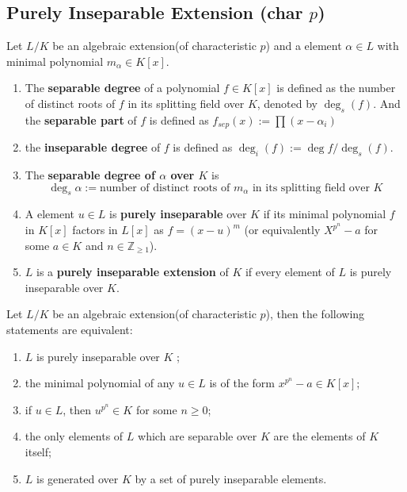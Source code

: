 \subsection{Purely Inseparable Extension (char $p$)} %
\begin{definition}
    Let $L/K$ be an algebraic extension(of characteristic $p$) and a element $\alpha \in L$ with minimal polynomial $m_\alpha \in K[x]$.
    \begin{enumerate}
        \item
              The \textbf{separable degree} of a polynomial $f \in K[x]$ is defined as the number of distinct roots of $f$ in its splitting field over $K$, denoted by $\deg_s \left(f\right)$.
              And the \textbf{separable part} of $f$ is defined as  $f_{sep}(x):=\prod (x-\alpha_i)$
        \item
              the \textbf{inseparable degree} of $f$ is defined as $\deg_i (f):=\deg f/\deg_s (f)$.

        \item
              The \textbf{separable degree of $\alpha$ over $K$} is
              \begin{equation*}
                  \deg_s \alpha
                  :=
                  \text{number of distinct roots of } m_\alpha \text{ in its splitting field over } K
              \end{equation*}
        \item
              A element $u \in L$ is \textbf{purely inseparable} over $K$ if its minimal polynomial $f$ in $K[x]$ factors in $L[x]$ as $f=(x-u)^{m}$ (or equivalently $X^{p^n}-a$ for some $a\in K$ and $n\in \mathbb{Z}_{\geq 1}$).
        \item
              $L$ is a \textbf{purely inseparable extension} of $K$ if every element of $L$ is purely inseparable over $K$.
    \end{enumerate}
\end{definition}


\begin{theorem}
    Let $L/K$ be an algebraic extension(of characteristic $p$), then the following statements are equivalent:
    \begin{enumerate}
        \item
              $L$ is purely inseparable over $K$ ;

        \item
              the minimal polynomial of any $u \in L$ is of the form $x^{p^n}-a \in K[x]$;

        \item
              if $ u\in L$, then $u^{p^{n}} \in K$ for some $n \geq 0$;

        \item
              the only elements of $L$ which are separable over $K$ are the elements of $K$ itself;

        \item
              $L$ is generated over $K$ by a set of purely inseparable elements.
    \end{enumerate}
\end{theorem}

